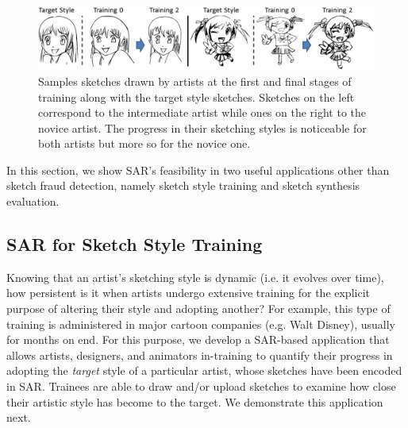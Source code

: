 \begin{figure}[htbp!]
\centering
\includegraphics[width = 1.0\textwidth]{images/trainingSamples}
\vspace{-4mm}\caption {Samples sketches drawn by artists at the first and final stages of training along with the target style sketches. Sketches on the left correspond to the intermediate artist while ones on the right to the novice artist. The progress in their sketching styles is noticeable for both artists but more so for the novice one.}
\label{trainingSamples}\vspace{-4mm}
\end{figure}

In this section, we show SAR's feasibility in two useful applications other than sketch fraud detection, namely sketch style training and sketch synthesis evaluation.


\vspace{-2mm}
\subsection{SAR for Sketch Style Training}
\vspace{-2mm}
Knowing that an artist's sketching style is dynamic (i.e. it evolves over time), how persistent is it when artists undergo extensive training for the explicit purpose of altering their style and adopting another? For example, this type of training is administered in major cartoon companies (e.g. Walt Disney), usually for months on end. For this purpose, we develop a SAR-based application that allows artists, designers, and animators in-training to quantify their progress in adopting the \emph{target} style of a particular artist, whose sketches have been encoded in SAR. Trainees are able to draw and/or upload sketches to examine how close their artistic style has become to the target. We demonstrate this application next.



